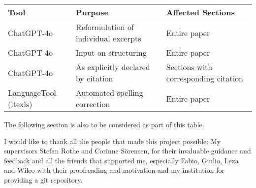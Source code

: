 \begin{table}[H]
    \begin{tabular}{lll}
        Tool & Purpose & Affected Sections \\ \hline
        ChatGPT-4o & Reformulation of individual excerpts & Entire paper \\
        ChatGPT-4o & Input on structuring & Entire paper \\
        ChatGPT-4o & As explicitly declared by citation & Sections with corresponding citation \\
        LanguageTool (ltexls) & Automated spelling correction & Entire paper \\
    \end{tabular}

\end{table}
The following section is also to be considered as part of this table.

\begingroup
\renewcommand{\cleardoublepage}{}
\renewcommand{\clearpage}{}
\label{chap:ack}
\endgroup
I would like to thank all the people that made this project possible: My supervisors Stefan Rothe and Corinne Sörensen, for their invaluable guidance and feedback and all the friends that supported me, especially Fabio, Giulio, Lexa and Wilco with their proofreading and motivation and my institution for providing a git repository.
